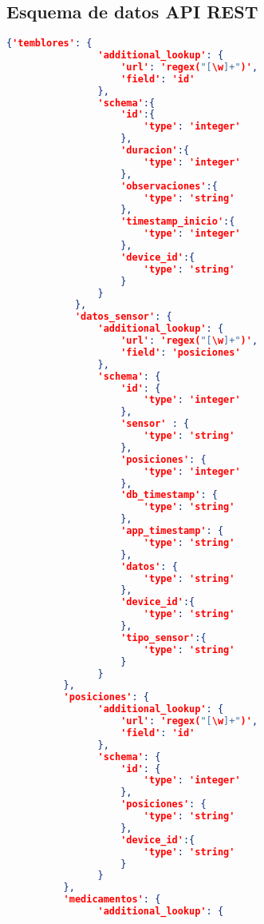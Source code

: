 \documentclass[11pt,spanish]{article}
\begin{document}
\subsection{Esquema de datos API REST} \label{esquema_datos}
\begin{lstlisting}[language=json,firstnumber=1]
{'temblores': {
                'additional_lookup': {
                    'url': 'regex("[\w]+")',
                    'field': 'id'
                },
                'schema':{
                    'id':{
                        'type': 'integer'
                    },
                    'duracion':{
                        'type': 'integer'
                    },
                    'observaciones':{
                        'type': 'string'
                    },
                    'timestamp_inicio':{
                        'type': 'integer'
                    },
                    'device_id':{
                        'type': 'string'
                    }
                }
            },
            'datos_sensor': {
                'additional_lookup': {
                    'url': 'regex("[\w]+")',
                    'field': 'posiciones'
                },
                'schema': {
                    'id': {
                        'type': 'integer'
                    },
                    'sensor' : {
                        'type': 'string'
                    },
                    'posiciones': {
                        'type': 'integer'
                    },
                    'db_timestamp': {
                        'type': 'string'
                    },
                    'app_timestamp': {
                        'type': 'string'
                    },
                    'datos': {
                        'type': 'string'
                    },
                    'device_id':{
                        'type': 'string'
                    },
                    'tipo_sensor':{
                        'type': 'string'
                    }
                }
          },
          'posiciones': {
                'additional_lookup': {
                    'url': 'regex("[\w]+")',
                    'field': 'id'
                },
                'schema': {
                    'id': {
                        'type': 'integer'
                    },
                    'posiciones': {
                        'type': 'string'
                    },
                    'device_id':{
                        'type': 'string'
                    }
                }
          },
          'medicamentos': {
                'additional_lookup': {

\end{lstlisting}
\end{document}
